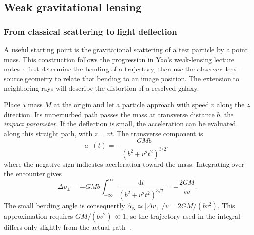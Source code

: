 \subsection{Weak gravitational lensing}
\label{sec:lensing}

\subsubsection{From classical scattering to light deflection}



A useful starting point is the gravitational scattering of a test particle by a point mass. This construction follows the progression in Yoo's weak-lensing lecture notes~\cite{yoo_weak_2026}: first determine the bending of a trajectory, then use the observer--lens--source geometry to relate that bending to an image position. The extension to neighboring rays will describe the distortion of a resolved galaxy.

Place a mass $M$ at the origin and let a particle approach with speed $v$ along the $z$ direction. Its unperturbed path passes the mass at transverse distance $b$, the \emph{impact parameter}. If the deflection is small, the acceleration can be evaluated along this straight path, with $z=vt$. The transverse component is
\begin{equation}
    a_{\perp}(t)=-\frac{GMb}{\left(b^2+v^2t^2\right)^{3/2}},
    \label{eq:classical-acceleration}
\end{equation}
where the negative sign indicates acceleration toward the mass. Integrating over the encounter gives
\begin{equation}
    \Delta v_{\perp}
    =-GMb\int_{-\infty}^{\infty}\frac{\mathrm{d}t}{\left(b^2+v^2t^2\right)^{3/2}}
    =-\frac{2GM}{bv}.
    \label{eq:classical-impulse}
\end{equation}
The small bending angle is consequently $\widehat\alpha_{\mathrm{N}}\simeq |\Delta v_{\perp}|/v=2GM/(bv^2)$. This approximation requires $GM/(bv^2)\ll1$, so the trajectory used in the integral differs only slightly from the actual path~\cite{yoo_weak_2026,bartelmann_weak_2001}.

